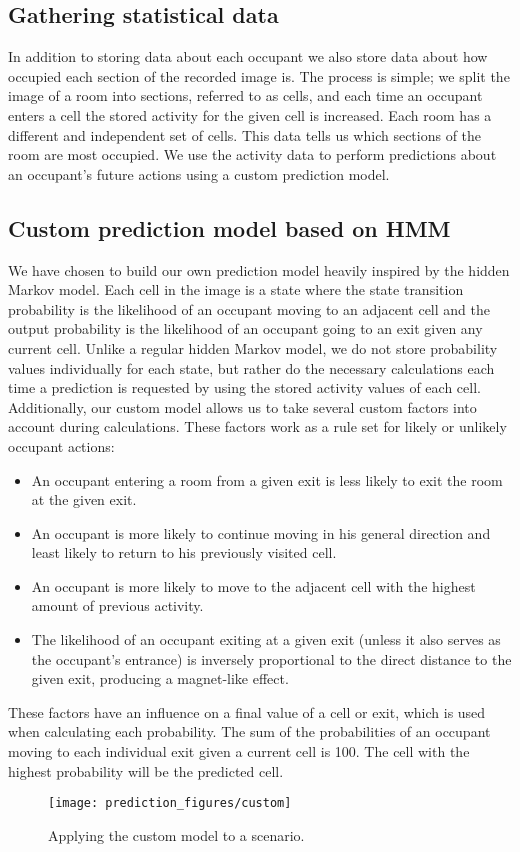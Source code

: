 \subsection{Gathering statistical data}
\label{ssub:statisticaldata}
In addition to storing data about each occupant we also store data about how occupied each section of the recorded image is. The process is simple; we split the image of a room into sections, referred to as cells, and each time an occupant enters a cell the stored activity for the given cell is increased. Each room has a different and independent set of cells. This data tells us which sections of the room are most occupied. We use the activity data to perform predictions about an occupant's future actions using a custom prediction model.

\subsection{Custom prediction model based on HMM}
\label{ssub:designcustomprediction}
We have chosen to build our own prediction model heavily inspired by the hidden Markov model. Each cell in the image is a state where the state transition probability is the likelihood of an occupant moving to an adjacent cell and the output probability is the likelihood of an occupant going to an exit given any current cell. Unlike a regular hidden Markov model, we do not store probability values individually for each state, but rather do the necessary calculations each time a prediction is requested by using the stored activity values of each cell. Additionally, our custom model allows us to take several custom factors into account during calculations. These factors work as a rule set for likely or unlikely occupant actions:
\begin{itemize}
\item An occupant entering a room from a given exit is less likely to exit the room at the given exit.
\item An occupant is more likely to continue moving in his general direction and least likely to return to his previously visited cell.
\item An occupant is more likely to move to the adjacent cell with the highest amount of previous activity.
\item The likelihood of an occupant exiting at a given exit (unless it also serves as the occupant's entrance) is inversely proportional to the direct distance to the given exit, producing a magnet-like effect. 
\end{itemize}
These factors have an influence on a final value of a cell or exit, which is used when calculating each probability. The sum of the probabilities of an occupant moving to each individual exit given a current cell is 100. The cell with the highest probability will be the predicted cell.
\begin{figure}[ht]
\centering
\texttt{[image: prediction\_figures/custom]}
\caption{Applying the custom model to a scenario.}
\label{fig:custom_model}
\end{figure}


